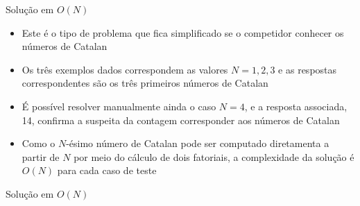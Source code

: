 \begin{frame}[fragile]{Solução em $O(N)$}

    \begin{itemize}
        \item Este é o tipo de problema que fica simplificado se o competidor conhecer os
            números de Catalan

        \item Os três exemplos dados correspondem as valores $N = 1, 2, 3$ e as respostas
            correspondentes são os três primeiros números de Catalan

        \item É possível resolver manualmente ainda o caso $N = 4$, e a resposta associada, 14,
            confirma a suspeita da contagem corresponder aos números de Catalan

        \item Como o $N$-ésimo número de Catalan pode ser computado diretamenta a partir de $N$
            por meio do cálculo de dois fatoriais, a complexidade da solução é $O(N)$ para cada
            caso de teste
    \end{itemize}

\end{frame}

\begin{frame}[fragile]{Solução em $O(N)$}
\end{frame}

